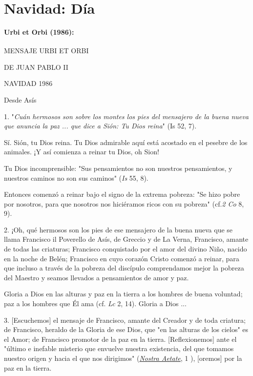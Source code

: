 \chapter{Navidad: Día}

\subsubsection{Urbi et Orbi (1986): }

MENSAJE URBI ET ORBI

DE JUAN PABLO II

NAVIDAD 1986

Desde Asís

1. "\emph{Cuán hermosos son sobre los montes los pies del mensajero de
	la buena nueva que anuncia la paz ... que dice a Sión: Tu Dios reina}"
(Is 52, 7).

Sí. Sión, tu Dios reina. Tu Dios admirable aquí está acostado en el
pesebre de los animales. ¡Y así comienza a reinar tu Dios, oh Sion!

Tu Dios incomprensible: "Sus pensamientos no son nuestros pensamientos,
y nuestros caminos no son sus caminos" (\emph{Is} 55, 8).

Entonces comenzó a reinar bajo el signo de la extrema pobreza: "Se hizo
pobre por nosotros, para que nosotros nos hiciéramos ricos con su
pobreza" (cf.\emph{2 Co} 8, 9).

2. ¡Oh, qué hermosos son los pies de ese mensajero de la buena nueva que
se llama Francisco il Poverello de Asís, de Greccio y de La Verna,
Francisco, amante de todas las criaturas; Francisco conquistado por el
amor del divino Niño, nacido en la noche de Belén; Francisco en cuyo
corazón Cristo comenzó a reinar, para que incluso a través de la pobreza
del discípulo comprendamos mejor la pobreza del Maestro y seamos
llevados a pensamientos de amor y paz.

Gloria a Dios en las alturas y paz en la tierra a los hombres de buena
voluntad; paz a los hombres que Él ama (cf. \emph{Lc} 2, 14). Gloria a
Dios ...

3. {[}Escuchemos{]} el mensaje de Francisco, amante del Creador y de
toda criatura; de Francisco, heraldo de la Gloria de ese Dios, que "en
las alturas de los cielos" es el Amor; de Francisco promotor de la paz
en la tierra. {[}Reflexionemos{]} ante el "último e inefable misterio
que envuelve nuestra existencia, del que tomamos nuestro origen y hacia
el que nos dirigimos"
(\href{http://www.vatican.va/archive/hist_councils/ii_vatican_council/documents/vat-ii_decl_19651028_nostra-aetate_it.html}{\emph{\emph{Nostra
			Aetate}}}, 1 ), {[}oremos{]} por la paz en la tierra.

